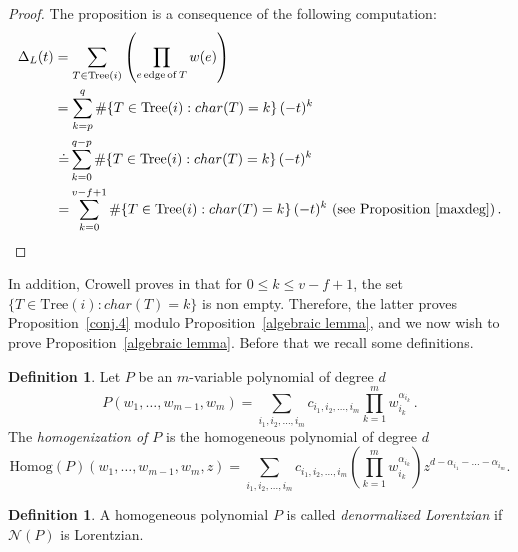 \documentclass[12pt,reqno]{amsart}
\theoremstyle{definition}
\newtheorem{definition}[theorem]{Definition}
\def\normal{\mathcal{N}}
\begin{document}
\begin{proof} The proposition is a consequence of the following computation:
\begin{align*}
  \Delta_L(t)  & = \sum\limits_{T \in \mathrm{Tree}(i)} \left( \prod\limits_{e \, \mathrm{edge} \, \mathrm{of} \, T} w(e) \right) \\
  & =  \sum\limits_{k = p}^{q} \# \{ T \in \mathrm{Tree}(i) : char(T) = k\} \, (-t)^k \\
  & \, \, \dot{=} \sum\limits_{k = 0}^{q-p} \# \{ T \in \mathrm{Tree}(i) : char(T) = k\} \, (-t)^k \\
  & \, \, {=} \sum\limits_{k = 0}^{v-f+1} \# \{ T \in \mathrm{Tree}(i) : char(T) = k\} \, (-t)^k \text{ (see Proposition~\ref{maxdeg})}\,. \qedhere
\end{align*}    
\end{proof}
In addition, Crowell proves in \cite{Cro} that for $0 \leq k \leq v-f+1$, the set $\{ T \in \mathrm{Tree}(i) : char(T) = k\}$ is non empty. Therefore, the latter proves Proposition~\ref{conj.4} modulo Proposition~\ref{algebraic lemma}, and we now wish to prove Proposition~\ref{algebraic lemma}. Before that we recall some definitions.

\begin{definition}\label{def.homog}
    Let $P$ be an $m$-variable polynomial of degree $d$ $$ P(w_1, \ldots, w_{m-1}, w_m) = \sum\limits_{i_1, i_2, \ldots, i_m} c_{i_1, i_2, \ldots, i_m} \prod\limits_{k=1}^{m} w_{i_k}^{\alpha_{i_k}}\,.$$
    The \emph{homogenization of $P$} is the homogeneous polynomial of degree $d$
    $$\mathrm{Homog}(P)(w_1, \ldots, w_{m-1}, w_m, z) = \sum\limits_{i_1, i_2, \ldots, i_m} c_{i_1, i_2, \ldots, i_m} \left( \prod\limits_{k=1}^{m} w_{i_k}^{\alpha_{i_k}} \right) z^{d-\alpha_{i_1} - \ldots - \alpha_{i_m}}.$$
\end{definition}

\begin{definition}
    A homogeneous polynomial $P$ is called \emph{denormalized Lorentzian} if $\normal(P)$ is Lorentzian.
\end{definition}
\end{document}

